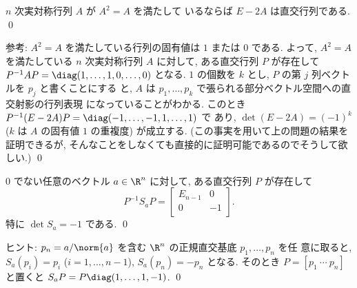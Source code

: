 \documentclass[12pt,twoside]{jarticle}
\begin{document}

\begin{question}
  $n$ 次実対称行列 $A$ が $A^2=A$ を満たして
  いるならば $E - 2A$ は直交行列である. \qed
\end{question}

\noindent
参考: $A^2=A$ を満たしている行列の固有値は $1$ または $0$ である. 
よって, $A^2=A$ を満たしている $n$ 次実対称行列 $A$ に対して, 
ある直交行列 $P$ が存在して $P^{-1}AP=\diag(1,\dots,1,0,\dots,0)$ となる.
$1$ の個数を $k$ とし, $P$ の第 $j$ 列ベクトルを $p_j$ と書くことにする
と, $A$ は $p_1,\dots,p_k$ で張られる部分ベクトル空間への直交射影の行列表現
になっていることがわかる. 
このとき $P^{-1}(E-2A)P=\diag(-1,\dots,-1,1,\dots,1)$ で
あり, $\det(E-2A)=(-1)^k$ ($k$ は $A$ の固有値 $1$ の重複度) が成立する.
(この事実を用いて上の問題の結果を証明できるが, 
そんなことをしなくても直接的に証明可能であるのでそうして欲しい.)
\qed


\begin{question}
  $0$ でない任意のベクトル $a\in\R^n$ に対して, 
  ある直交行列 $P$ が存在して
  \begin{equation*}
    P^{-1} S_a P = 
    \begin{bmatrix}
      E_{n-1} &  0 \\
         0    & -1 \\
    \end{bmatrix}.
  \end{equation*}
  特に $\det S_a = -1$ である.  \qed
\end{question}

\noindent
ヒント: $p_n = a/\norm{a}$ を含む $\R^n$ の正規直交基底 $p_1,\dots,p_n$ を任
意に取ると, $S_a(p_i)=p_i$ ($i=1,\dots,n-1$), $S_a(p_n)=-p_n$ となる.
そのとき $P=[p_1\ \cdots\ p_n]$ と置くと $S_aP=P\diag(1,\dots,1,-1)$. 
\qed

\end{document}
